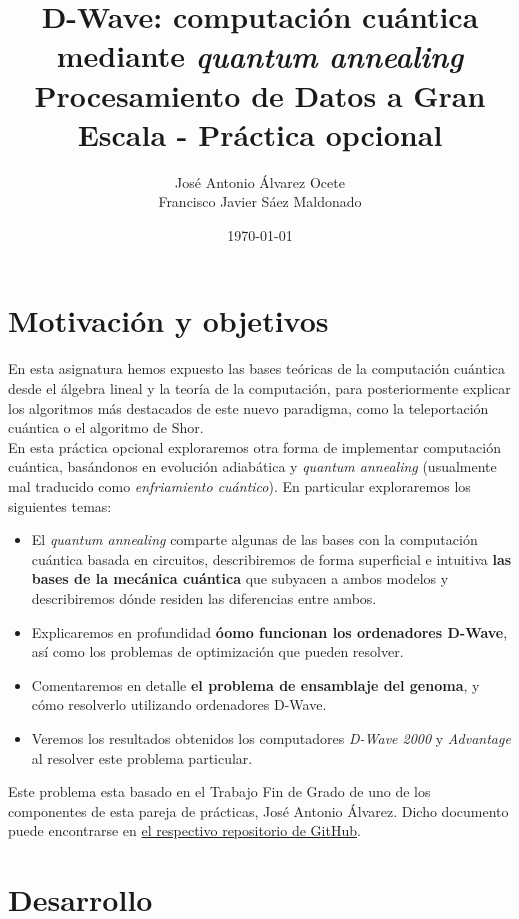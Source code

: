 \documentclass[11pt]{article}
\author{José Antonio Álvarez Ocete\\ Francisco Javier Sáez Maldonado}
\date{\today}
\title{D-Wave: computación cuántica mediante \emph{quantum annealing}\\\medskip
\large Procesamiento de Datos a Gran Escala - Práctica opcional}
\begin{document}
\maketitle

\tableofcontents

\section{Motivación y objetivos}

En esta asignatura hemos expuesto las bases teóricas de la computación cuántica desde el álgebra lineal y la teoría de la computación, para posteriormente explicar los algoritmos más destacados de este nuevo paradigma, como la teleportación cuántica o el algoritmo de Shor. \\

En esta práctica opcional exploraremos otra forma de implementar computación cuántica, basándonos en evolución adiabática y \emph{quantum annealing} (usualmente mal traducido como \emph{enfriamiento cuántico}). En particular exploraremos los siguientes temas:

\begin{itemize}
	\item El \emph{quantum annealing} comparte algunas de las bases con la computación cuántica basada en circuitos, describiremos de forma superficial e intuitiva \textbf{las bases de la mecánica cuántica} que subyacen a ambos modelos y describiremos dónde residen las diferencias entre ambos.
	
	\item Explicaremos en profundidad \textbf{óomo funcionan los ordenadores D-Wave}, así como los problemas de optimización que pueden resolver.

	\item Comentaremos en detalle \textbf{el problema de ensamblaje del genoma}, y cómo resolverlo utilizando ordenadores D-Wave.
	
	\item Veremos los resultados obtenidos los computadores \emph{D-Wave 2000} y \emph{Advantage} al resolver este problema particular.
\end{itemize}

Este problema esta basado en el Trabajo Fin de Grado de uno de los componentes de esta pareja de prácticas, José Antonio Álvarez. Dicho documento puede encontrarse en \href{https://github.com/Ocete/TFG/blob/main/thesis.pdf}{el respectivo repositorio de GitHub}.

\section{Desarrollo}
\end{document}
